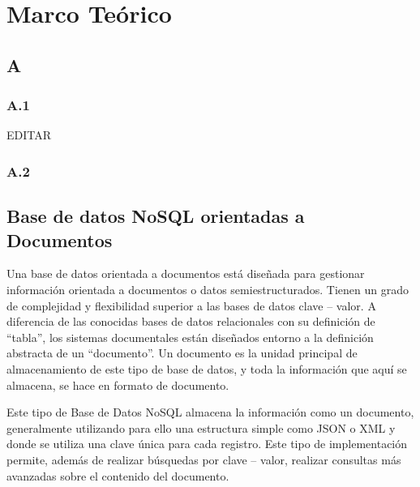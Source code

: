 \documentclass[preprint,12pt]{elsarticle}
\begin{document}



\section{Marco Teórico}


\subsection {\textbf{A}}

\subsubsection{\textbf{A.1}}

EDITAR \cite{SQLne}  %

\subsubsection{\textbf{A.2}}


\subsection {\textbf{Base de datos NoSQL orientadas a Documentos}}
Una base de datos orientada a documentos está diseñada para gestionar información orientada a documentos o datos semiestructurados. Tienen un grado de complejidad y flexibilidad superior a las bases de datos clave – valor. \newline
A diferencia de las conocidas bases de datos relacionales con su definición de “tabla”, los sistemas documentales están diseñados entorno a la definición abstracta de un “documento”. Un documento es la unidad principal de almacenamiento de este tipo de base de datos, y toda la información que aquí se almacena, se hace en formato de documento. \newline

Este tipo de Base de Datos NoSQL almacena la información como un documento, generalmente utilizando para ello una estructura simple como JSON o XML y donde se utiliza una clave única para cada registro. Este tipo de implementación permite, además de realizar búsquedas por clave – valor, realizar consultas más avanzadas sobre el contenido del documento.
\cite{BDnoSQLMongodb}
\end{document}
